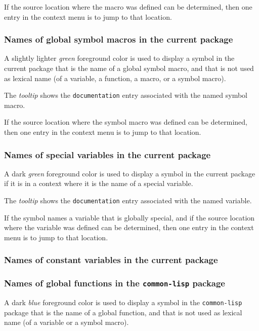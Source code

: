 If the source location where the macro was defined can be
determined, then one entry in the context menu is to jump to that
location.

\subsubsection{Names of global symbol macros in the current package}

A slightly lighter \emph{green} foreground color is used to display a
symbol in the current package that is the name of a global symbol
macro, and that is not used as lexical name (of a variable, a
function, a macro, or a symbol macro).

The \emph{tooltip} shows the \texttt{documentation} entry associated
with the named symbol macro.

If the source location where the symbol macro was defined can be
determined, then one entry in the context menu is to jump to that
location.

\subsubsection{Names of special variables in the current package}

A dark \emph{green} foreground color is used to display a symbol in
the current package if it is in a context where it is the name of a
special variable.

The \emph{tooltip} shows the \texttt{documentation} entry associated
with the named variable.

If the symbol names a variable that is globally special, and if
the source location where the variable was defined can be
determined, then one entry in the context menu is to jump to that
location.

\subsubsection{Names of constant variables in the current package}

\subsubsection{Names of global functions in the \texttt{common-lisp} package}

A dark \emph{blue} foreground color is used to display a symbol in the
\texttt{common-lisp} package that is the name of a global function,
and that is not used as lexical name (of a variable or a symbol
macro).


